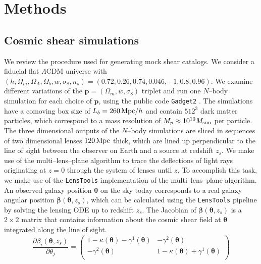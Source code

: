 \documentclass[reprint,aps,prd,superscriptaddress,showkeys,showpacs]{revtex4-1}
\newcommand{\bb}[1]{\mathbf{#1}}
\newcommand{\ttt}[1]{\texttt{#1}}
\begin{document}
\section{Methods}


\subsection{Cosmic shear simulations}
\label{sec:shearsim}
We review the procedure used for generating mock shear catalogs. We consider a fiducial flat $\Lambda$CDM universe with $(h,\Omega_m,\Omega_\Lambda,\Omega_b,w,\sigma_8,n_s)=(0.72,0.26,0.74,0.046,-1,0.8,0.96)$. We examine different variations of the $\bb{p}=(\Omega_m,w,\sigma_8)$ triplet and run one $N$--body simulation for each choice of $\bb{p}$, using the public code \ttt{Gadget2} \citep{Gadget2}. The simulations have a comoving box size of $L_b=260\,{\rm Mpc}/h$ and contain $512^3$ dark matter particles, which correspond to a mass resolution of $M_p\approx 10^{10}M_{\rm sun}$ per particle. The three dimensional outputs of the $N$--body simulations are sliced in sequences of two dimensional lenses $120 \,{\rm Mpc}$ thick, which are lined up perpendicular to the line of sight between the observer on Earth and a source at redshift $z_s$. We make use of the multi--lens--plane algorithm \citep{RayTracingJain,RayTracingHartlap} to trace the deflections of light rays originating at $z=0$ through the system of lenses until $z$. To accomplish this task, we make use of the \ttt{LensTools} \citep{LensTools-ASCL,LensTools-paper} implementation of the multi--lens--plane algorithm. An observed galaxy position $\pmb{\theta}$ on the sky today corresponds to a real galaxy angular position $\pmb{\beta}(\pmb{\theta},z_s)$, which can be calculated using the \ttt{LensTools} pipeline by solving the lensing ODE up to redshift $z_s$. The Jacobian of $\pmb{\beta}(\pmb{\theta},z_s)$ is a $2\times 2$ matrix that contains information about the cosmic shear field at $\pmb{\theta}$ integrated along the line of sight. 
%
\begin{equation}
\label{meth:sheareqn}
\frac{\partial\beta_i(\pmb{\theta},z_s)}{\partial \theta_j} = 
\begin{pmatrix}
1-\kappa(\pmb{\theta})-\gamma^1(\pmb{\theta}) & -\gamma^2(\pmb{\theta}) \\
-\gamma^2(\pmb{\theta}) & 1-\kappa(\pmb{\theta})+\gamma^1(\pmb{\theta})\\
\end{pmatrix}
\end{equation}  
\end{document}
